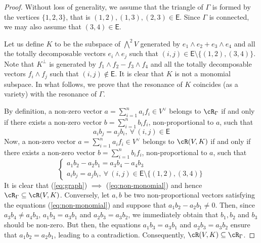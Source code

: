 \documentclass[10pt, leqno]{amsart}
\begin{document}
\begin{proof}
Without loss of generality, we assume that the triangle of $\Gamma$ is formed by the vertices $\{1,2,3\}$, that is $(1,2), (1,3), (2,3) \in \mathsf{E}$. Since $\Gamma$ is connected, we may also assume that $(3,4) \in \mathsf{E}$. 

Let us define $K$ to be the subspace of $\bigwedge^2V$ generated by $e_1 \wedge e_2 + e_3 \wedge e_4$ and all the totally decomposable vectors $e_i \wedge e_j$ such that $(i,j) \in \mathsf{E} \setminus \{(1,2), (3,4) \}$. Note that $K^\perp$ is generated by $f_1 \wedge f_2 - f_3 \wedge f_4$ and all the totally decomposable vectors $f_i \wedge f_j$ such that $(i,j) \notin \mathsf{E}$. It is clear that $K$ is not a monomial subspace. In what follows, we prove that the resonance of $K$ coincides (as a variety) with the resonance of $\Gamma$. 

By definition, a non-zero vector $a  = \sum_{i=1}^n a_i f_i \in V^\vee$ belongs to $\cR_\Gamma$ if and only if there exists a non-zero vector $b = \sum_{i=1}^n b_i f_i$, non-proportional to $a$, such that
\begin{equation} \label{eq:graph}
    a_i b_j = a_j b_i, \ \forall \ (i,j) \in \mathsf{E}
\end{equation}
Now, a non-zero vector $a  = \sum_{i=1}^n a_i f_i \in V^\vee$ belongs to $\cR(V,K)$ if and only if there exists a non-zero vector $b = \sum_{i=1}^n b_i f_i$, non-proportional to $a$, such that
\begin{equation} \label{eq:non-monomial}
    \begin{cases}
        a_1 b_2 - a_2 b_1 = a_3 b_4 - a_4 b_3 \\
        a_i b_j = a_j b_i, \ \forall \ (i,j) \in \mathsf{E}\setminus \{(1,2), (3,4) \}
    \end{cases}
\end{equation}
It is clear that (\ref{eq:graph}) $\implies$ (\ref{eq:non-monomial}) and hence $\cR_\Gamma \subseteq \cR(V,K)$. Conversely, let $a,b$ be two non-proportional vectors satisfying the equations (\ref{eq:non-monomial}) and suppose that $a_1 b_2 - a_2 b_1 \neq 0$. Then, since $a_3 b_4 \neq a_4 b_3$, $a_1 b_3 = a_3 b_1$ and $a_2 b_3 = a_3 b_2$, we immediately obtain that $b_1, b_2$ and $b_3$ should be non-zero. But then, the equations $a_1 b_3 = a_3 b_1$ and $a_2 b_3 = a_3 b_2$ ensure that $a_1 b_2 = a_2 b_1$, leading to a contradiction. Consequently, $\cR(V,K) \subseteq \cR_\Gamma$. 
\end{proof}
\end{document}
